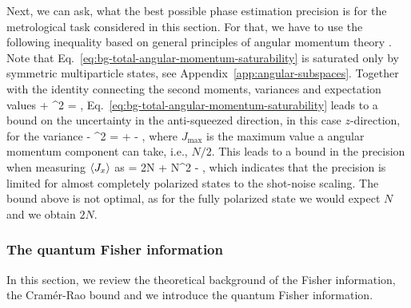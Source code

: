 Next, we can ask, what the best possible phase estimation precision is for the metrological task considered in this section.
For that, we have to use the following inequality based on general principles of angular momentum theory
\be
  \label{eq:bg-total-angular-momentum-saturability}
   \leqslant {}.
\ee
Note that Eq.~\eqref{eq:bg-total-angular-momentum-saturability} is saturated only by symmetric multiparticle states, see Appendix~\ref{app:angular-subspaces}.
Together with the identity connecting the second moments, variances and expectation values
\be
   + ^2 = ,
\ee
Eq.~\eqref{eq:bg-total-angular-momentum-saturability} leads to a bound on the uncertainty in the anti-squeezed direction, in this case $z$-direction, for the variance
\be
   \leqslant {} - ^2 =  +  - \rpar,
\ee
where $J_{\max}$ is the maximum value a angular momentum component can take, i.e., $N/2$.
This leads to a bound in the precision when measuring $\langle{J_x}\rangle$ as
\be
  \label{eq:bg-unpolarize-states-are-better}
  \varinv{\theta} = \leqslant 2N + N^2 - \rpar,
\ee
which indicates that the precision is limited for almost completely polarized states to the shot-noise scaling.
The bound above is not optimal, as for the fully polarized state we would expect $N$ and we obtain $2N$.

\subsubsection{The quantum Fisher information}
\label{sec:bg-qfi}

In this section, we review the theoretical background of the Fisher information, the Cram\'er-Rao bound and we introduce the quantum Fisher information.

